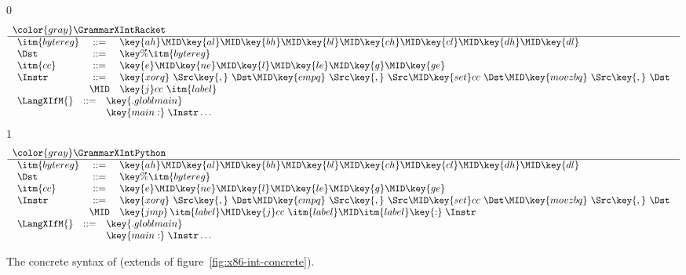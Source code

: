 \documentclass[7x10]{TimesAPriori_MIT}%
\newcommand{\gray}[1]{{\color{gray} #1}}
\def\racketEd{0}
\def\pythonEd{1}
\providecommand{\BookEdition}{1}
\let\edition\BookEdition
\numberwithin{theorem}{chapter}
\numberwithin{definition}{chapter}
\numberwithin{equation}{chapter}
\begin{document}
\newcommand{\GrammarXIfRacket}{
\begin{array}{lcl}
  \itm{bytereg} &::=& \key{ah} \MID \key{al} \MID \key{bh} \MID \key{bl}
    \MID \key{ch} \MID \key{cl} \MID \key{dh} \MID \key{dl} \\
\Dst &::=& \key{\%}\itm{bytereg}\\
\itm{cc} & ::= & \key{e} \MID \key{ne} \MID \key{l} \MID \key{le} \MID \key{g} \MID \key{ge} \\
\Instr &::=& \key{xorq}~\Src\key{,}~\Dst
   \MID \key{cmpq}~\Src\key{,}~\Src
    \MID  \key{set}cc~\Dst 
    \MID \key{movzbq}~\Src\key{,}~\Dst \\
    &\MID& \key{j}cc~\itm{label} \\
\end{array}
}

\newcommand{\GrammarXIfPython}{
\begin{array}{lcl}
  \itm{bytereg} &::=& \key{ah} \MID \key{al} \MID \key{bh} \MID \key{bl}
    \MID \key{ch} \MID \key{cl} \MID \key{dh} \MID \key{dl} \\
\Dst &::=& \key{\%}\itm{bytereg}\\
\itm{cc} & ::= & \key{e} \MID \key{ne} \MID \key{l} \MID \key{le} \MID \key{g} \MID \key{ge} \\
\Instr &::=& \key{xorq}~\Src\key{,}~\Dst
   \MID \key{cmpq}~\Src\key{,}~\Src
    \MID  \key{set}cc~\Dst 
    \MID \key{movzbq}~\Src\key{,}~\Dst \\
    &\MID& \key{jmp}\,\itm{label} \MID \key{j}cc~\itm{label} 
           \MID \itm{label}\key{:}\; \Instr 
\end{array}
}


\begin{figure}[tp]
  \begin{tcolorbox}[colback=white]
{\if\edition\racketEd    
\[
\begin{array}{l}
  \gray{\GrammarXIntRacket} \\ \hline
  \GrammarXIfRacket \\ 
\begin{array}{lcl}
\LangXIfM{} &::= &  \key{.globl main} \\
      &    & \key{main:} \; \Instr\ldots 
\end{array}
\end{array}
\]
\fi}
{\if\edition\pythonEd    
\[
\begin{array}{l}
  \gray{\GrammarXIntPython} \\ \hline
  \GrammarXIfPython \\ 
\begin{array}{lcl}
\LangXIfM{} &::= &  \key{.globl main} \\
      &    & \key{main:} \; \Instr\ldots 
\end{array}
\end{array}
\]
\fi}
\end{tcolorbox}
\caption{The concrete syntax of \LangXIf{}  (extends \LangXInt{} of figure~\ref{fig:x86-int-concrete}).}
\label{fig:x86-1-concrete}
\end{figure}
\end{document}
